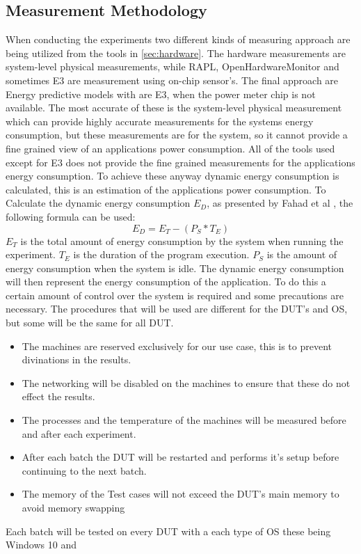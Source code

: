 \subsection{Measurement Methodology}
When conducting the experiments two different kinds of measuring approach are being utilized from the tools in \cref{sec:hardware}.
The hardware measurements are system-level physical measurements, while RAPL, OpenHardwareMonitor and sometimes E3 are measurement using on-chip sensor's. The final approach are Energy predictive models with are E3, when the power meter chip is not available. The most accurate of these is the system-level physical measurement which can provide highly accurate measurements for the systems energy consumption, but these measurements are for the system, so it cannot provide a fine grained view of an applications power consumption. All of the tools used except for E3 does not provide the fine grained measurements for the applications energy consumption. To achieve these anyway dynamic energy consumption is calculated, this is an estimation of the applications power consumption. To Calculate the dynamic energy consumption $E_D$, as presented by Fahad et al \cite{fahad2019comparative}, the following formula can be used:
$$E_D = E_T -(P_S * T_E)$$
$E_T$ is the total amount of energy consumption by the system when running the experiment. $T_E$ is the duration of the program execution. $P_S$ is the amount of energy consumption when the system is idle. The dynamic energy consumption will then represent the energy consumption of the application. To do this a certain amount of control over the system is required and some precautions are necessary. The procedures that will be used are different for the DUT's and OS, but some will be the same for all DUT.
\begin{itemize}
    \item The machines are reserved exclusively for our use case, this is to prevent divinations in the results.
    \item The networking will be disabled on the machines to ensure that these do not effect the results.
    \item The processes and the temperature of the machines will be measured before and after each experiment.
    \item After each batch the DUT will be restarted and performs it's setup before continuing to the next batch.
    \item The memory of the Test cases will not exceed the DUT's main memory to avoid memory swapping
\end{itemize}
Each batch will be tested on every DUT with a each type of OS these being Windows 10 and 



